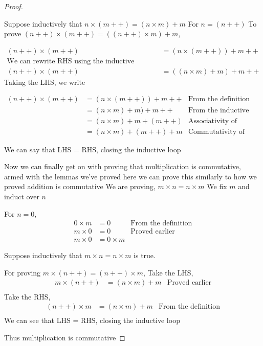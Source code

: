 \documentclass[11pt]{report}
\begin{document}
\begin{proof}
\begin{enumerate}
		      Suppose inductively that $n \times (m++) = (n \times m) + m$
		      For $n = (n++)$
		      To prove $(n++) \times (m++) = ((n++) \times m) + m$,

		      \begin{align*}
			      (n++) \times (m++) & = (n \times (m++)) + m++            \\
			      \text{We can rewrite RHS using the inductive hypothesis} \\
			      (n++) \times (m++) & = ((n \times m) + m) + m++
		      \end{align*}
		      Taking the LHS, we write

		      \begin{align*}
			      (n++) \times (m++) & = (n \times (m++)) + m++  & \text{From the definition}           \\
			                         & = (n \times m)+ m) + m++  & \text{From the inductive hypothesis} \\
			                         & = (n \times m)+ m + (m++) & \text{Associativity of addition}     \\
			                         & = (n \times m)+ (m++) + m & \text{Commutativity of addition}
		      \end{align*}

		      We can say that LHS = RHS, closing the inductive loop
	\end{enumerate}
	Now we can finally get on with proving that multiplication is commutative, armed with the lemmas we've proved here we can prove this similarly to how we proved addition is commutative
	We are proving, $m \times n = n \times m$
	We fix $m$ and induct over $n$

	For $n=0$,
	\begin{align*}
		0 \times m & = 0          & \text{From the definition} \\
		m \times 0 & = 0          & \text{Proved earlier}      \\
		m \times 0 & = 0 \times m
	\end{align*}

	Suppose inductively that $m \times n = n \times m$ is true.

	For proving $m \times (n++) = (n++) \times m$,
	Take the LHS,
	\begin{align*}
		m \times (n++) & = (n \times m) + m & \text{Proved earlier} \\
	\end{align*}
	Take the RHS,
	\begin{align*}
		(n++) \times m & = (n \times m) + m & \text{From the definition} \\
	\end{align*}
	We can see that LHS = RHS, closing the inductive loop

	Thus multiplication is commutative
\end{proof}
\end{document}
